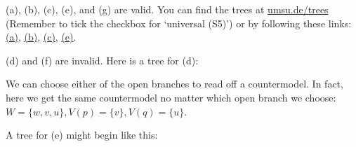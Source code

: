 \begin{solution}
  (a), (b), (c), (e), and (g) are valid. You can find the trees at
  \href{https://www.umsu.de/trees/}{umsu.de/trees} (Remember to tick the checkbox for `universal (S5)') or by following these links:
  \href{https://www.umsu.de/trees/#p~5~8~9p||universality}{(a)},
\href{https://www.umsu.de/trees/#~9~9p~5~9p||universality}{(b)},
\href{https://www.umsu.de/trees/#~9(p~1q)~5(~9p~1~9q)||universality}{(c)},
\href{https://www.umsu.de/trees/#~9(p~2q)~4(~9p~2~9q)||universality}{(e)}.
  
  (d) and (f) are invalid. Here is a tree for (d):

  \medskip

  \medskip\noindent
  We can choose either of the open branches to read off a countermodel. In fact, here we get the same countermodel no matter which open branch we choose:
$W = \{ w,v,u \}, V(p)=\{ v\}, V(q)=\{u\}$.
  \medskip

  A tree for (e) might begin like this:


\end{solution}
